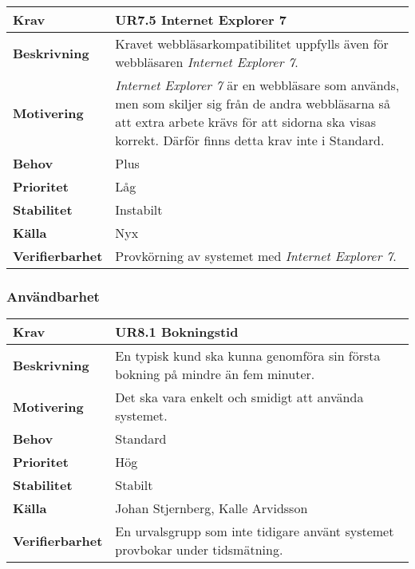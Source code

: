 \documentclass[a4paper, twoside, 11pt, titlepage]{article}
\begin{document}
		\begin {table} [ht] \begin{tabular} { p{2.6cm} p{12.5cm} }
			\hline
			{\sffamily\textbf{Krav}} & {\sffamily\textbf{UR7.5 Internet Explorer 7}} \\
			\hline
			{\sffamily\textbf{Beskrivning}} & {Kravet webbläsarkompatibilitet uppfylls även för webbläsaren \emph{Internet Explorer 7}.} \\
			\hline
			{\sffamily\textbf{Motivering}} & { \emph{Internet Explorer 7} är en webbläsare som används, men som skiljer sig från de andra webbläsarna så att extra arbete krävs för att sidorna ska visas korrekt. Därför finns detta krav inte i Standard.} \\
			\hline
			{\sffamily\textbf{Behov}} & {Plus} \\
			\hline
			{\sffamily\textbf{Prioritet}} & {Låg} \\
			\hline
			{\sffamily\textbf{Stabilitet}} & {Instabilt} \\
			\hline
			{\sffamily\textbf{Källa}} & {Nyx} \\
			\hline
			{\sffamily\textbf{Verifierbarhet}} & {Provkörning av systemet med \emph{Internet Explorer 7}.} \\
			\hline
		\end{tabular} \end{table} \FloatBarrier


		\subsubsection{Användbarhet}


		\begin {table} [ht] \begin{tabular} { p{2.6cm} p{12.5cm} }
			\hline
			{\sffamily\textbf{Krav}} & {\sffamily\textbf{UR8.1 Bokningstid}} \\
			\hline
			{\sffamily\textbf{Beskrivning}} & {En typisk kund ska kunna genomföra sin första bokning på mindre än fem minuter.} \\
			\hline
			{\sffamily\textbf{Motivering}} & {Det ska vara enkelt och smidigt att använda systemet.} \\
			\hline
			{\sffamily\textbf{Behov}} & {Standard} \\
			\hline
			{\sffamily\textbf{Prioritet}} & {Hög} \\
			\hline
			{\sffamily\textbf{Stabilitet}} & {Stabilt} \\
			\hline
			{\sffamily\textbf{Källa}} & {Johan Stjernberg, Kalle Arvidsson} \\
			\hline
			{\sffamily\textbf{Verifierbarhet}} & {En urvalsgrupp som inte tidigare använt systemet provbokar under tidsmätning.} \\
			\hline
		\end{tabular} \end{table} \FloatBarrier
		\vspace{6mm}
\end{document}
